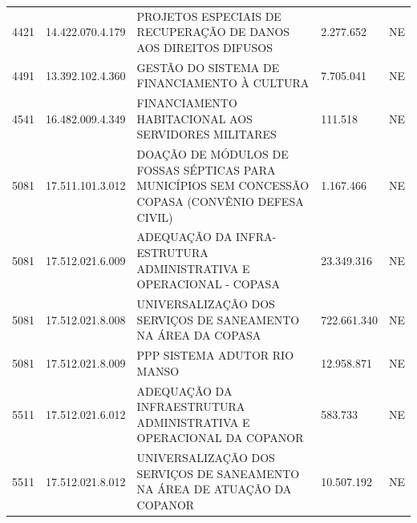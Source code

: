 \documentclass{article}
\begin{document}
\begin{longtable}[c]{m{1cm}|m{2cm}|m{10cm}|m{2cm}|m{1cm}}
\multicolumn{1}{C{1cm}|}{4421} & \multicolumn{1}{C{2cm}|}{14.422.070.4.179} & \multicolumn{1}{L{10cm}|}{PROJETOS ESPECIAIS DE RECUPERAÇÃO DE DANOS AOS DIREITOS DIFUSOS} & \multicolumn{1}{R{2cm}|}{2.277.652} & \multicolumn{1}{C{1cm}}{NE} \\
\multicolumn{1}{C{1cm}|}{4491} & \multicolumn{1}{C{2cm}|}{13.392.102.4.360} & \multicolumn{1}{L{10cm}|}{GESTÃO DO SISTEMA DE FINANCIAMENTO À CULTURA} & \multicolumn{1}{R{2cm}|}{7.705.041} & \multicolumn{1}{C{1cm}}{NE} \\
\multicolumn{1}{C{1cm}|}{4541} & \multicolumn{1}{C{2cm}|}{16.482.009.4.349} & \multicolumn{1}{L{10cm}|}{FINANCIAMENTO HABITACIONAL AOS SERVIDORES MILITARES} & \multicolumn{1}{R{2cm}|}{111.518} & \multicolumn{1}{C{1cm}}{NE} \\
\multicolumn{1}{C{1cm}|}{5081} & \multicolumn{1}{C{2cm}|}{17.511.101.3.012} & \multicolumn{1}{L{10cm}|}{DOAÇÃO DE MÓDULOS DE FOSSAS SÉPTICAS PARA MUNICÍPIOS SEM CONCESSÃO COPASA (CONVÊNIO DEFESA CIVIL)} & \multicolumn{1}{R{2cm}|}{1.167.466} & \multicolumn{1}{C{1cm}}{NE} \\
\multicolumn{1}{C{1cm}|}{5081} & \multicolumn{1}{C{2cm}|}{17.512.021.6.009} & \multicolumn{1}{L{10cm}|}{ADEQUAÇÃO DA INFRA-ESTRUTURA ADMINISTRATIVA E OPERACIONAL - COPASA} & \multicolumn{1}{R{2cm}|}{23.349.316} & \multicolumn{1}{C{1cm}}{NE} \\
\multicolumn{1}{C{1cm}|}{5081} & \multicolumn{1}{C{2cm}|}{17.512.021.8.008} & \multicolumn{1}{L{10cm}|}{UNIVERSALIZAÇÃO DOS SERVIÇOS DE SANEAMENTO NA ÁREA DA COPASA} & \multicolumn{1}{R{2cm}|}{722.661.340} & \multicolumn{1}{C{1cm}}{NE} \\
\multicolumn{1}{C{1cm}|}{5081} & \multicolumn{1}{C{2cm}|}{17.512.021.8.009} & \multicolumn{1}{L{10cm}|}{PPP SISTEMA ADUTOR RIO MANSO} & \multicolumn{1}{R{2cm}|}{12.958.871} & \multicolumn{1}{C{1cm}}{NE} \\
\multicolumn{1}{C{1cm}|}{5511} & \multicolumn{1}{C{2cm}|}{17.512.021.6.012} & \multicolumn{1}{L{10cm}|}{ADEQUAÇÃO DA INFRAESTRUTURA ADMINISTRATIVA E OPERACIONAL DA COPANOR} & \multicolumn{1}{R{2cm}|}{583.733} & \multicolumn{1}{C{1cm}}{NE} \\
\multicolumn{1}{C{1cm}|}{5511} & \multicolumn{1}{C{2cm}|}{17.512.021.8.012} & \multicolumn{1}{L{10cm}|}{UNIVERSALIZAÇÃO DOS SERVIÇOS DE SANEAMENTO NA ÁREA DE ATUAÇÃO DA COPANOR} & \multicolumn{1}{R{2cm}|}{10.507.192} & \multicolumn{1}{C{1cm}}{NE} \\
\hline\hline

\end{longtable}
\end{document}
